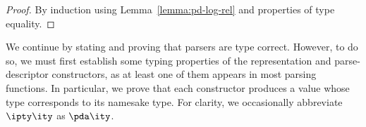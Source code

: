 \begin{proof}
  By induction using Lemma~\ref{lemma:pd-log-rel} and properties of   \fomega{} type equality.
\end{proof}

We continue by stating and proving that parsers are type correct.
However, to do so, we must first establish some typing properties of
the representation and parse-descriptor constructors, as at least one of them appears in most
parsing functions. In particular, we prove that each constructor
produces a value whose type corresponds to its namesake \ddc{}
type. For clarity, we occasionally abbreviate $\ipty \ity$ as $\pda \ity$.

